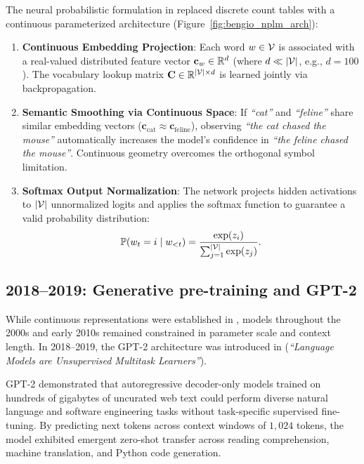 \documentclass[../../main.tex]{subfiles}
\begin{document}
The neural probabilistic formulation in \cite{bengio2003} replaced discrete count tables with a continuous parameterized architecture (Figure~\ref{fig:bengio_nplm_arch}):
\begin{enumerate}
    \item \textbf{Continuous Embedding Projection}: Each word $w \in \mathcal{V}$ is associated with a real-valued distributed feature vector $\mathbf{c}_w \in \mathbb{R}^d$ (where $d \ll |\mathcal{V}|$, e.g., $d = 100$). The vocabulary lookup matrix $\mathbf{C} \in \mathbb{R}^{|\mathcal{V}| \times d}$ is learned jointly via backpropagation.
    \item \textbf{Semantic Smoothing via Continuous Space}: If \textit{``cat''} and \textit{``feline''} share similar embedding vectors ($\mathbf{c}_{\text{cat}} \approx \mathbf{c}_{\text{feline}}$), observing \textit{``the cat chased the mouse''} automatically increases the model's confidence in \textit{``the feline chased the mouse''}. Continuous geometry overcomes the orthogonal symbol limitation.
    \item \textbf{Softmax Output Normalization}: The network projects hidden activations to $|\mathcal{V}|$ unnormalized logits and applies the softmax function to guarantee a valid probability distribution:
    \begin{equation}
    \label{eq:bengio_softmax}
    \mathbb{P}(w_t = i \mid w_{<t}) = \frac{\exp(z_i)}{\sum_{j=1}^{|\mathcal{V}|} \exp(z_j)}.
    \end{equation}
\end{enumerate}

\subsection{2018--2019: Generative pre-training and GPT-2}
\label{subsec:milestone_gpt2}

While continuous representations were established in \cite{bengio2003}, models throughout the 2000s and early 2010s remained constrained in parameter scale and context length. In 2018--2019, the GPT-2 architecture was introduced in \cite{radford2019} (\textit{``Language Models are Unsupervised Multitask Learners''}).

GPT-2 demonstrated that autoregressive decoder-only models trained on hundreds of gigabytes of uncurated web text could perform diverse natural language and software engineering tasks without task-specific supervised fine-tuning. By predicting next tokens across context windows of $1{,}024$ tokens, the model exhibited emergent zero-shot transfer across reading comprehension, machine translation, and Python code generation.
\end{document}
